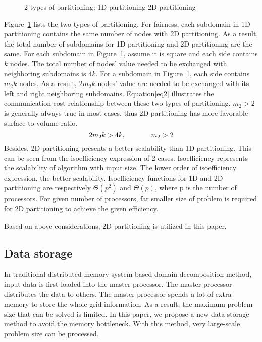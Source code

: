 \documentclass{sig-alternate}
\begin{document}
	\begin{figure}[htbp]
	  \caption{2 types of partitioning:
	   1D partitioning
	   2D partitioning }
	  \label{Fig3}
	\end{figure}
	Figure~\ref{Fig3} lists the two types of partitioning. For fairness, each subdomain in 1D partitioning contains the 
	same number of nodes with 2D partitioning. As a result, the total number of subdomains for 1D partitioning and 2D partitioning are the same. For 
	each subdomain 
	in Figure~\ref{Fig3}, assume  it is square and each side contains $k$ nodes. The total 
	number of nodes' value needed to be exchanged with neighboring subdomains is $4k$. For a subdomain in 
	Figure~\ref{Fig3}, each side contains
	$m_2k$ nodes. As a result, $2m_2k$ nodes' value are needed to be exchanged with its left and right 
	neighboring subdomains. Equation\eqref{eq2} illustrates the communication cost relationship between these two types of
	partitioning. $m_2>2$ is generally always true in most cases, thus 2D partitioning has more favorable surface-to-volume ratio.    
	\begin{equation}
		2m_2k > 4k, \hspace{0.5 in} m_2 > 2 \label{eq2}
	\end{equation}
	Besides, 2D partitioning presents a better scalability than 1D partitioning. This can be
	seen from the isoefficiency expression of 2 cases. Isoefficiency represents the scalability of algorithm
	with input size. The lower order of isoefficiency expression, the better scalability. Isoefficiency functions for 1D 
	and 2D partitioning are respectively $\Theta(p^2)$ and $\Theta(p)$\cite{Grama, Kumar}, where p is the number of processors. 
	For given number of processors, far smaller size of problem is required for 2D partitioning to achieve the given efficiency.

	Based on above considerations, 2D partitioning is utilized in this paper. 
  \subsection{Data storage}
	In traditional distributed memory system based domain decomposition method, input data is first loaded into the master processor. 
	The master processor distributes the data to others. The master processor spends a lot of extra memory to store the whole grid 
	information. As a result, the maximum problem size that can be solved is limited. In this paper, we propose a new data storage 
	method to avoid the memory bottleneck. With this method, very large-scale problem size can be processed.
\end{document}
